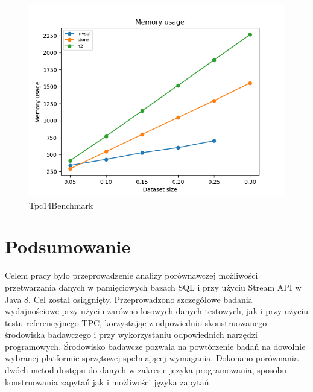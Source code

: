 \documentclass[12pt,twoside,openright]{extarticle}
\begin{document}
\begin{figure}[H]
\centering
\includegraphics[width=13cm]{plots/memory}
\caption{Tpc14Benchmark}
    \label{fig:memoryconsumption}
\end{figure}
    

\cleardoublepage
\section{Podsumowanie}


Celem pracy było przeprowadzenie analizy porównawczej możliwości przetwarzania danych w pamięciowych bazach SQL i przy użyciu Stream API w Java 8. Cel został osiągnięty. Przeprowadzono szczegółowe badania wydajnościowe przy użyciu zarówno losowych danych testowych, jak i przy użyciu testu referencyjnego TPC, korzystając z odpowiednio skonstruowanego środowiska badawczego i przy wykorzystaniu odpowiednich narzędzi programowych. Środowisko badawcze pozwala na powtórzenie badań na dowolnie wybranej platformie sprzętowej spełniającej wymagania. Dokonano porównania dwóch metod dostępu do danych w zakresie języka programowania, sposobu konstruowania zapytań jak i możliwości języka zapytań.
\end{document}
